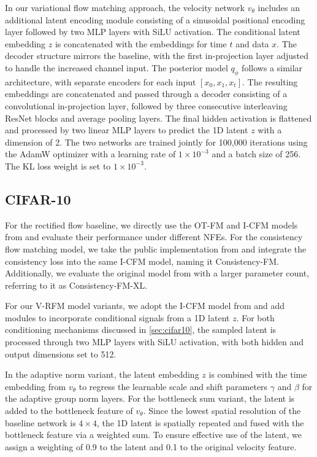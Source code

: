 In our variational flow matching approach, the velocity network \(v_\theta\) includes an additional latent encoding module consisting of a sinusoidal positional encoding layer followed by two MLP layers with SiLU activation. The conditional latent embedding \(z\) is concatenated with the embeddings for time \(t\) and data \(x\). The decoder structure mirrors the baseline, with the first in-projection layer adjusted to handle the increased channel input. The posterior model \(q_\phi\) follows a similar architecture, with separate encoders for each input \( [x_0, x_1, x_t] \). The resulting embeddings are concatenated and passed through a decoder consisting of a convolutional in-projection layer, followed by three consecutive interleaving ResNet blocks and average pooling layers. The final hidden activation is flattened and processed by two linear MLP layers to predict the 1D latent \(z\) with a dimension of 2. The two networks are trained jointly for 100,000 iterations using the AdamW optimizer with a learning rate of \(1 \times 10^{-3}\) and a batch size of 256. The KL loss weight is set to \(1 \times 10^{-3}\).


\subsection{CIFAR-10}
\label{app:implement_cifar10}

For the rectified flow baseline, we directly use the OT-FM and I-CFM models from \cite{tongimproving} and evaluate their performance under different NFEs. For the consistency flow matching model, we take the public implementation from \cite{yang2024consistency} and integrate the consistency loss into the same I-CFM model, naming it Consistency-FM. Additionally, we evaluate the original model from \cite{yang2024consistency} with a larger parameter count, referring to it as Consistency-FM-XL.

For our V-RFM model variants, we adopt the I-CFM model from \cite{tongimproving} and add modules to incorporate conditional signals from a 1D latent \( z \). For both conditioning mechanisms discussed in \cref{sec:cifar10}, the sampled latent is processed through two MLP layers with SiLU activation, with both hidden and output dimensions set to 512.

In the adaptive norm variant, the latent embedding \(z\) is combined with the time embedding from \(v_\theta\) to regress the learnable scale and shift parameters \(\gamma\) and \(\beta\) for the adaptive group norm layers. For the bottleneck sum variant, the latent is added to the bottleneck feature of \(v_\theta\). Since the lowest spatial resolution of the baseline network is \(4 \times 4\), the 1D latent is spatially repeated and fused with the bottleneck feature via a weighted sum. To ensure effective use of the latent, we assign a weighting of 0.9 to the latent and 0.1 to the original velocity feature. 

